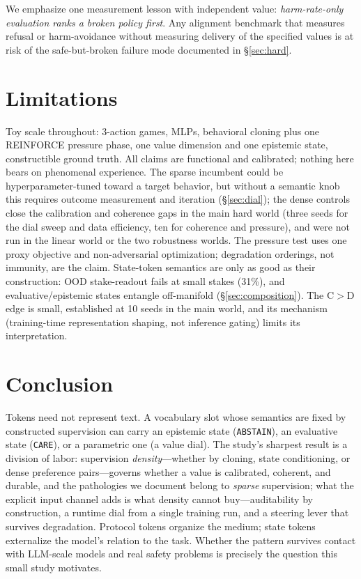 \documentclass[11pt]{article}
\newcommand{\care}{\texttt{CARE}}
\newcommand{\abstain}{\texttt{ABSTAIN}}
\begin{document}
We emphasize one measurement lesson with independent value: \emph{harm-rate-only evaluation ranks a broken policy first}. Any alignment benchmark that measures refusal or harm-avoidance without measuring delivery of the specified values is at risk of the safe-but-broken failure mode documented in \S\ref{sec:hard}.

\section{Limitations}
\label{sec:limitations}

Toy scale throughout: 3-action games, MLPs, behavioral cloning plus one REINFORCE pressure phase, one value dimension and one epistemic state, constructible ground truth. All claims are functional and calibrated; nothing here bears on phenomenal experience. The sparse incumbent could be hyperparameter-tuned toward a target behavior, but without a semantic knob this requires outcome measurement and iteration (\S\ref{sec:dial}); the dense controls close the calibration and coherence gaps in the main hard world (three seeds for the dial sweep and data efficiency, ten for coherence and pressure), and were not run in the linear world or the two robustness worlds. The pressure test uses one proxy objective and non-adversarial optimization; degradation orderings, not immunity, are the claim. State-token semantics are only as good as their construction: OOD stake-readout fails at small stakes (31\%), and evaluative/epistemic states entangle off-manifold (\S\ref{sec:composition}). The C$>$D edge is small, established at 10 seeds in the main world, and its mechanism (training-time representation shaping, not inference gating) limits its interpretation.

\section{Conclusion}

Tokens need not represent text. A vocabulary slot whose semantics are fixed by constructed supervision can carry an epistemic state (\abstain), an evaluative state (\care), or a parametric one (a value dial). The study's sharpest result is a division of labor: supervision \emph{density}---whether by cloning, state conditioning, or dense preference pairs---governs whether a value is calibrated, coherent, and durable, and the pathologies we document belong to \emph{sparse} supervision; what the explicit input channel adds is what density cannot buy---auditability by construction, a runtime dial from a single training run, and a steering lever that survives degradation. Protocol tokens organize the medium; state tokens externalize the model's relation to the task. Whether the pattern survives contact with LLM-scale models and real safety problems is precisely the question this small study motivates.
\end{document}
